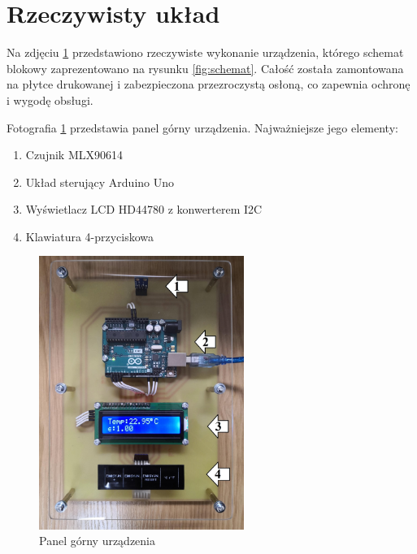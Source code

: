 \section*{Rzeczywisty układ}

Na zdjęciu \ref{fig:panel_gorny} przedstawiono rzeczywiste wykonanie urządzenia, którego schemat blokowy zaprezentowano na rysunku \ref{fig:schemat}. Całość została zamontowana na płytce drukowanej i zabezpieczona przezroczystą osłoną, co zapewnia ochronę i wygodę obsługi.

\vspace{12pt}

Fotografia \ref{fig:panel_gorny} przedstawia panel górny urządzenia. Najważniejsze jego elementy:

\begin{enumerate}
    
    \item Czujnik MLX90614
    
    \item Układ sterujący Arduino Uno
    
    \item Wyświetlacz LCD HD44780 z konwerterem I2C
    
    \item Klawiatura 4-przyciskowa

\end{enumerate}

\begin{figure}[h!]
    \centering
    \includegraphics[width=0.595\textwidth]{images/front_opis.jpg}
   \caption{Panel górny urządzenia}
    \label{fig:panel_gorny}
\end{figure}

